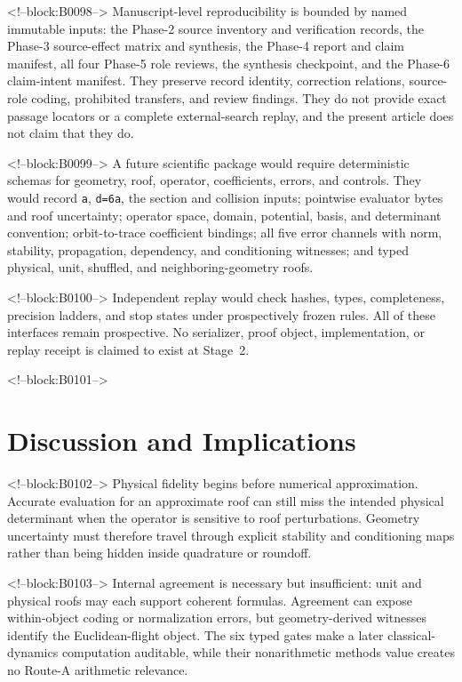 \documentclass[11pt,a4paper]{article}
\begin{document}
<!--block:B0098-->
Manuscript-level reproducibility is bounded by named immutable inputs: the Phase-2 source inventory and verification records, the Phase-3 source-effect matrix and synthesis, the Phase-4 report and claim manifest, all four Phase-5 role reviews, the synthesis checkpoint, and the Phase-6 claim-intent manifest. They preserve record identity, correction relations, source-role coding, prohibited transfers, and review findings. They do not provide exact passage locators or a complete external-search replay, and the present article does not claim that they do.

<!--block:B0099-->
A future scientific package would require deterministic schemas for geometry, roof, operator, coefficients, errors, and controls. They would record \texttt{a}, \texttt{d=6a}, the section and collision inputs; pointwise evaluator bytes and roof uncertainty; operator space, domain, potential, basis, and determinant convention; orbit-to-trace coefficient bindings; all five error channels with norm, stability, propagation, dependency, and conditioning witnesses; and typed physical, unit, shuffled, and neighboring-geometry roofs.

<!--block:B0100-->
Independent replay would check hashes, types, completeness, precision ladders, and stop states under prospectively frozen rules. All of these interfaces remain prospective. No serializer, proof object, implementation, or replay receipt is claimed to exist at Stage~2.

<!--block:B0101-->
\section{Discussion and Implications}

<!--block:B0102-->
Physical fidelity begins before numerical approximation. Accurate evaluation for an approximate roof can still miss the intended physical determinant when the operator is sensitive to roof perturbations. Geometry uncertainty must therefore travel through explicit stability and conditioning maps rather than being hidden inside quadrature or roundoff.

<!--block:B0103-->
Internal agreement is necessary but insufficient: unit and physical roofs may each support coherent formulas. Agreement can expose within-object coding or normalization errors, but geometry-derived witnesses identify the Euclidean-flight object. The six typed gates make a later classical-dynamics computation auditable, while their nonarithmetic methods value creates no Route-A arithmetic relevance.
\end{document}
